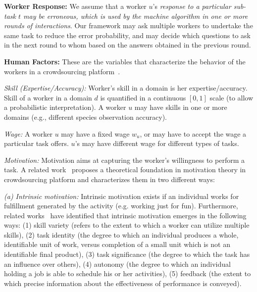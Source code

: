{\bf Worker Response:} We assume that a worker $u$'s {\em response to a particular sub-task $t$ may be erroneous, which is used by the machine algorithm in one or more rounds of interactions}. Our framework may ask multiple workers to undertake the same task to reduce the error probability, and may decide which questions to ask in the next round to whom based on the answers obtained in the previous round.

{\bf Human Factors:} These are the variables that characterize the behavior of the workers  in a crowdsourcing platform~\cite{hf1,motiv00,motiv0,motiv1,motiv2,motiv3,motiv4}.

{\em Skill (Expertise/Accuracy):}  Worker's skill in a domain is her expertise/accuracy. Skill of a worker in a domain $d$ is quantified in a continuous $[0,1]$ scale (to allow a probabilistic  interpretation). A worker $u$ may have skills in one or more domains (e.g., different species observation accuracy). 

{\em Wage:} A worker $u$ may have a fixed wage $w_u$, or may have to accept the wage a particular task offers. $u$'s may have different wage for different types of tasks.

{\em Motivation:} Motivation aims at capturing the worker's willingness to perform a task. A related work~\cite{motiv1} proposes a theoretical foundation in motivation theory in crowdsourcing platform and characterizes them in two different ways: 

{\em (a) Intrinsic motivation:} Intrinsic motivation exists if an individual works for fulfillment generated by the activity (e.g. working just for fun). Furthermore, related works~\cite{motiv1,motiv2,motiv3} have identified that intrinsic motivation emerges in the following ways: (1) skill variety (refers to the extent to which a worker can utilize multiple skills), (2) task identity (the degree to which an individual produces a whole, identifiable unit of work, versus completion of a small unit which is not an identifiable final product), (3) task significance (the degree to which the task has an influence over others), (4) autonomy (the degree to which an individual holding a job is able to schedule his or her activities), (5) feedback (the extent to which precise information about the effectiveness of performance is conveyed). 


